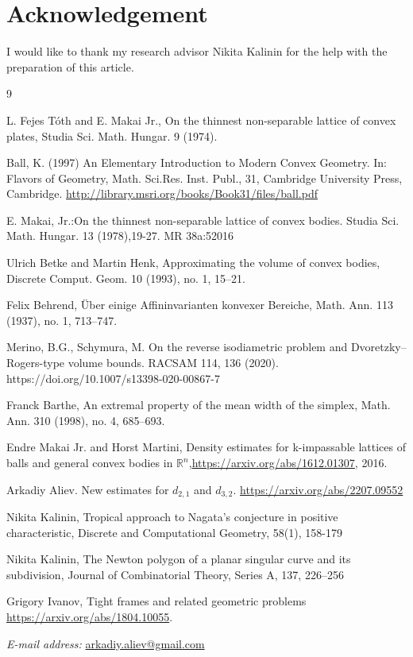 \documentclass[12pt]{article}
\begin{document}
\section*{Acknowledgement}
\noindent I would like to thank my research advisor Nikita Kalinin for the help with the preparation of this article.

\begin{thebibliography}{9}

    
     L. Fejes T\'oth and E. Makai Jr., On the thinnest non-separable lattice of convex plates, Studia Sci. Math. Hungar. 9 (1974).

     Ball, K. (1997) An Elementary Introduction to Modern Convex Geometry. In: Flavors of Geometry, Math. Sci.Res. Inst. Publ., 31, Cambridge University Press, Cambridge. \url{http://library.msri.org/books/Book31/files/ball.pdf}


    E. Makai, Jr.:On the thinnest non-separable lattice of convex bodies. Studia Sci. Math. Hungar. 13 (1978),19-27. MR 38a:52016

      Ulrich Betke and Martin Henk, Approximating the volume of convex bodies, Discrete
Comput. Geom. 10 (1993), no. 1, 15–21.


    Felix Behrend, Über einige Affininvarianten konvexer Bereiche, Math. Ann. 113
(1937), no. 1, 713–747.

 Merino, B.G., Schymura, M. On the reverse isodiametric problem and Dvoretzky–Rogers-type volume bounds. RACSAM 114, 136 (2020). https://doi.org/10.1007/s13398-020-00867-7

 Franck Barthe, An extremal property of the mean width of the simplex, Math. Ann.
310 (1998), no. 4, 685–693.

  Endre Makai Jr. and Horst Martini, Density estimates for k-impassable lattices of balls and general convex bodies in $\mathbb{R}^n$,\url{https://arxiv.org/abs/1612.01307}, 2016.
      
    
   Arkadiy Aliev. New estimates for $d_{2,1}$ and $d_{3,2}$. \url{https://arxiv.org/abs/2207.09552}

   Nikita Kalinin, Tropical approach to Nagata’s conjecture in positive characteristic, Discrete and Computational Geometry, 58(1), 158-179

   Nikita Kalinin, The Newton polygon of a planar singular curve and its subdivision, Journal of
Combinatorial Theory, Series A, 137, 226–256

  

     Grigory Ivanov, Tight frames and related geometric problems \url{https://arxiv.org/abs/1804.10055}.

   
    

    
    
\end{thebibliography}

\textit{E-mail address:} \href{mailto:arkadiy.aliev@gmail.com}{arkadiy.aliev@gmail.com} 
\end{document}

